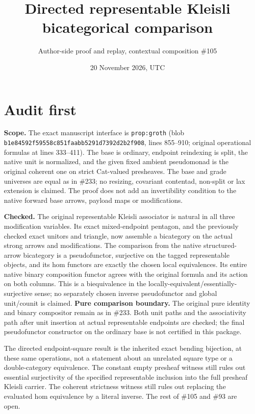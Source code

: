 \documentclass[11pt]{article}
\title{Directed representable Kleisli bicategorical comparison}
\author{Author-side proof and replay, contextual composition \#105}
\date{20 November 2026, UTC}
\newcommand{\code}[1]{\nolinkurl{#1}}
\begin{document}
\maketitle
\section*{Audit first}
\textbf{Scope.} The exact manuscript interface is \code{prop:groth} (blob
\code{b1e84592f59558c851faabb5291d7392d2b2f908}, lines 855--910; original
operational formulas at lines 333--411). The base is ordinary, endpoint
reindexing is split, the native unit is normalized, and the given fixed
ambient pseudomonad is the original coherent one on strict Cat-valued
presheaves. The base and grade universes are equal as in \#233; no resizing,
covariant contentad, non-split or lax extension is claimed. The proof
does not add an invertibility condition to the native forward base arrows,
payload maps or modifications.

\textbf{Checked.} The original representable Kleisli associator is natural
in all three modification variables. Its exact mixed-endpoint pentagon,
and the previously checked exact unitors and triangle, now assemble a
bicategory on the actual strong arrows and modifications. The comparison
from the native structured-arrow bicategory is a pseudofunctor, surjective
on the tagged representable objects, and its hom functors are exactly
the chosen local equivalences. Its entire native binary composition functor
agrees with the original formula and its action on both columns. This is a
biequivalence in the locally-equivalent/essentially-surjective sense; no
separately chosen inverse pseudofunctor and global unit/counit is claimed.
\textbf{Pure comparison boundary.} The original pure identity and
binary compositor remain as in \#233. Both unit paths and the
associativity path after unit insertion at actual representable endpoints
are checked; the final pseudofunctor constructor on the ordinary base is
not certified in this package.

The directed endpoint-square result is the inherited exact bending
bijection, at these same operations, not a statement about an unrelated
square type or a double-category equivalence. The constant empty
presheaf witness still rules out essential surjectivity of the specified
representable inclusion into the full presheaf Kleisli carrier. The
coherent strictness witness still rules out replacing the evaluated hom
equivalence by a literal inverse. The rest of \#105 and \#93 are open.
\end{document}
